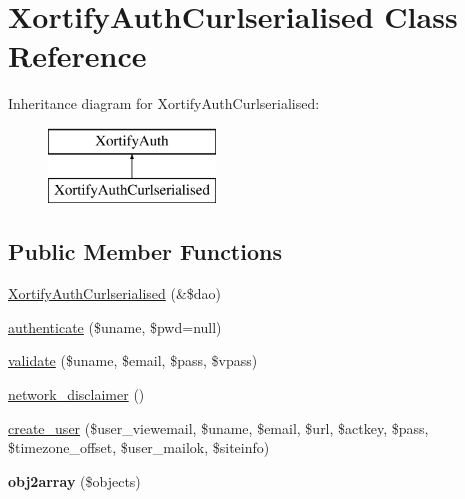 \hypertarget{class_xortify_auth_curlserialised}{\section{Xortify\-Auth\-Curlserialised Class Reference}
\label{class_xortify_auth_curlserialised}
}
Inheritance diagram for Xortify\-Auth\-Curlserialised\-:\begin{figure}[H]
\begin{center}
\leavevmode
\includegraphics[height=2.000000cm]{class_xortify_auth_curlserialised}
\end{center}
\end{figure}
\subsection*{Public Member Functions}
\begin{DoxyCompactItemize}
\item 
\hyperlink{class_xortify_auth_curlserialised_ad8dc9a71e59eb9ba69ba3868ffe63fd6}{Xortify\-Auth\-Curlserialised} (\&\$dao)
\item 
\hyperlink{class_xortify_auth_curlserialised_a7e556d3df4daa3ae5cf28cc88bba7af5}{authenticate} (\$uname, \$pwd=null)
\item 
\hyperlink{class_xortify_auth_curlserialised_a664044df8555e557efc94edd93f0b20c}{validate} (\$uname, \$email, \$pass, \$vpass)
\item 
\hyperlink{class_xortify_auth_curlserialised_abcf97aad748d91e7861aed098b65d874}{network\-\_\-disclaimer} ()
\item 
\hyperlink{class_xortify_auth_curlserialised_a8cdfc464b86345af05c21d2f85565486}{create\-\_\-user} (\$user\-\_\-viewemail, \$uname, \$email, \$url, \$actkey, \$pass, \$timezone\-\_\-offset, \$user\-\_\-mailok, \$siteinfo)
\item 
\hypertarget{class_xortify_auth_curlserialised_a658f076c16d1497c5818a0711e57711b}{{\bfseries obj2array} (\$objects)}\label{class_xortify_auth_curlserialised_a658f076c16d1497c5818a0711e57711b}

\end{DoxyCompactItemize}
